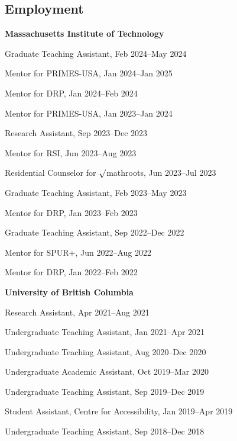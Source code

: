 \documentclass[margin,line]{res}
\newenvironment{list1}{
  \begin{list}{\ding{113}}{%
      \setlength{\itemsep}{0in}
      \setlength{\parsep}{0.025in} \setlength{\parskip}{0in}
      \setlength{\topsep}{0in} \setlength{\partopsep}{0in}
      \setlength{\leftmargin}{0.17in}}}{\end{list}}
\begin{document}
\begin{resume}
\section{\sc Employment}

{\bf Massachusetts Institute of Technology}\\
\vspace*{-.1in}
\begin{list1}
\item[] Graduate Teaching Assistant, Feb 2024--May 2024
\item[] Mentor for PRIMES-USA, Jan 2024--Jan 2025
\item[] Mentor for DRP, Jan 2024--Feb 2024
\item[] Mentor for PRIMES-USA, Jan 2023--Jan 2024
\item[] Research Assistant, Sep 2023--Dec 2023
\item[] Mentor for RSI, Jun 2023--Aug 2023
\item[] Residential Counselor for $\surd$mathroots, Jun 2023--Jul 2023
\item[] Graduate Teaching Assistant, Feb 2023--May 2023
\item[] Mentor for DRP, Jan 2023--Feb 2023
\item[] Graduate Teaching Assistant, Sep 2022--Dec 2022
\item[] Mentor for SPUR+, Jun 2022--Aug 2022
\item[] Mentor for DRP, Jan 2022--Feb 2022
\end{list1}

{\bf University of British Columbia}\\
\vspace*{-.1in}
\begin{list1}
\item[] Research Assistant, Apr 2021--Aug 2021 %
\item[] Undergraduate Teaching Assistant, Jan 2021--Apr 2021
\item[] Undergraduate Teaching Assistant, Aug 2020--Dec 2020
\item[] Undergraduate Academic Assistant, Oct 2019--Mar 2020
\item[] Undergraduate Teaching Assistant, Sep 2019--Dec 2019
\item[] Student Assistant, Centre for Accessibility, Jan 2019--Apr 2019
\item[] Undergraduate Teaching Assistant, Sep 2018--Dec 2018
\end{list1}


\end{resume}
\end{document}
